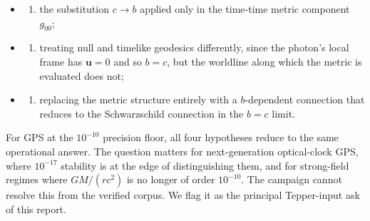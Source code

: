 \documentclass[
  11pt,
]{article}
\providecommand{\tightlist}{%
  \setlength{\itemsep}{0pt}\setlength{\parskip}{0pt}}
\begin{document}
\begin{itemize}
\item
  \begin{enumerate}
  \def\labelenumi{(\alph{enumi})}
  \tightlist
  \item
    the substitution \(c \to b\) applied only in the time-time metric
    component \(g_{00}\);
  \end{enumerate}
\item
  \begin{enumerate}
  \def\labelenumi{(\alph{enumi})}
  \setcounter{enumi}{1}
  \tightlist
  \item
    treating null and timelike geodesics differently, since the photon's
    local frame has \(\mathbf{u} = 0\) and so \(b = c\), but the
    worldline along which the metric is evaluated does not;
  \end{enumerate}
\item
  \begin{enumerate}
  \def\labelenumi{(\alph{enumi})}
  \setcounter{enumi}{2}
  \tightlist
  \item
    replacing the metric structure entirely with a \(b\)-dependent
    connection that reduces to the Schwarzschild connection in the
    \(b = c\) limit.
  \end{enumerate}
\end{itemize}

For GPS at the \(10^{-10}\) precision floor, all four hypotheses reduce
to the same operational answer. The question matters for next-generation
optical-clock GPS, where \(10^{-17}\) stability is at the edge of
distinguishing them, and for strong-field regimes where \(GM/(rc^2)\) is
no longer of order \(10^{-10}\). The campaign cannot resolve this from
the verified corpus. We flag it as the principal Tepper-input ask of
this report.
\end{document}
